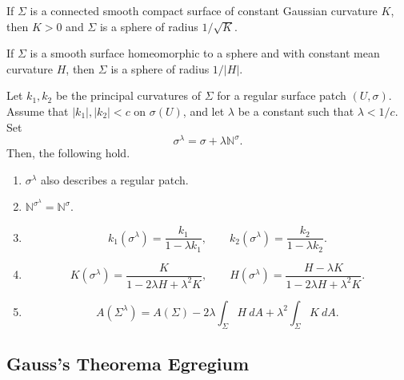 \documentclass[11pt]{article}
\newcommand{\N}{\mathbb{N}}
\theoremstyle{definition}
\theoremstyle{remark}
\numberwithin{equation}{section}
\begin{document}
    \begin{theorem}[Liebmann]
        If $\Sigma$ is a connected smooth compact surface of constant Gaussian
        curvature $K$, then $K > 0$ and $\Sigma$ is a sphere of radius $1 /
        \sqrt{K}$.
    \end{theorem}

    \begin{theorem}[Hopf]
        If $\Sigma$ is a smooth surface homeomorphic to a sphere and with constant
        mean curvature $H$, then $\Sigma$ is a sphere of radius $1 / |H|$.
    \end{theorem}

    \begin{theorem}
        Let $k_1, k_2$ be the principal curvatures of $\Sigma$ for a regular surface
        patch $(U, \sigma)$. Assume that $|k_1|, |k_2| < c$ on $\sigma(U)$, and let
        $\lambda$ be a constant such that $\lambda < 1 / c$. Set \[
            \sigma^\lambda = \sigma + \lambda \N^\sigma.
        \] Then, the following hold.
        \begin{enumerate}
            \itemsep0em
            \item $\sigma^\lambda$ also describes a regular patch.
            \item $\N^{\sigma^\lambda} = \N^\sigma$.
            \item \[
                k_1(\sigma^\lambda) = \frac{k_1}{1 - \lambda k_1}, \qquad
                k_2(\sigma^\lambda) = \frac{k_2}{1 - \lambda k_2}.
            \] 
            \item \[
                K(\sigma^\lambda) = \frac{K}{1 - 2\lambda H + \lambda^2 K}, \qquad
                H(\sigma^\lambda) = \frac{H - \lambda K}{1 - 2\lambda H + \lambda^2
                K}.
            \] 
            \item \[
                A(\Sigma^\lambda) = A(\Sigma) - 2\lambda\int_\Sigma H\:dA + \lambda^2
                \int_\Sigma K\:dA.
            \] 
        \end{enumerate}
    \end{theorem}


    \subsection{Gauss's Theorema Egregium}
    
\end{document}
